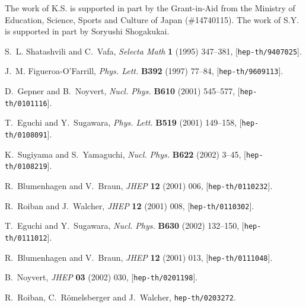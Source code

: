 \documentclass[a4paper,12pt]{article}
\numberwithin{equation}{section}
\begin{document}
The work of K.S. is supported in part by the Grant-in-Aid from the Ministry 
of Education, Science, Sports and Culture of Japan
(\#14740115).
The work of S.Y. is supported in part by Soryushi Shogakukai.
\providecommand{\href}[2]{#2}\begingroup\raggedright\begin{thebibliography}{10}

S.~L. Shatashvili and C.~Vafa, {\em Selecta Math} {\bf 1} (1995) 347--381,
  [\href{http://xxx.lanl.gov/abs/hep-th/9407025}{{\tt hep-th/9407025}}].

J.~M. Figueroa-O'Farrill, {\em Phys. Lett.} {\bf B392} (1997) 77--84,
  [\href{http://xxx.lanl.gov/abs/hep-th/9609113}{{\tt hep-th/9609113}}].

D.~Gepner and B.~Noyvert, {\em Nucl. Phys.} {\bf B610} (2001) 545--577,
  [\href{http://xxx.lanl.gov/abs/hep-th/0101116}{{\tt hep-th/0101116}}].

T.~Eguchi and Y.~Sugawara, {\em Phys. Lett.} {\bf B519} (2001) 149--158,
  [\href{http://xxx.lanl.gov/abs/hep-th/0108091}{{\tt hep-th/0108091}}].

K.~Sugiyama and S.~Yamaguchi, {\em Nucl. Phys.} {\bf B622} (2002) 3--45,
  [\href{http://xxx.lanl.gov/abs/hep-th/0108219}{{\tt hep-th/0108219}}].

R.~Blumenhagen and V.~Braun, {\em JHEP} {\bf 12} (2001) 006,
  [\href{http://xxx.lanl.gov/abs/hep-th/0110232}{{\tt hep-th/0110232}}].

R.~Roiban and J.~Walcher, {\em JHEP} {\bf 12} (2001) 008,
  [\href{http://xxx.lanl.gov/abs/hep-th/0110302}{{\tt hep-th/0110302}}].

T.~Eguchi and Y.~Sugawara, {\em Nucl. Phys.} {\bf B630} (2002) 132--150,
  [\href{http://xxx.lanl.gov/abs/hep-th/0111012}{{\tt hep-th/0111012}}].

R.~Blumenhagen and V.~Braun, {\em JHEP} {\bf 12} (2001) 013,
  [\href{http://xxx.lanl.gov/abs/hep-th/0111048}{{\tt hep-th/0111048}}].

B.~Noyvert, {\em JHEP} {\bf 03} (2002) 030,
  [\href{http://xxx.lanl.gov/abs/hep-th/0201198}{{\tt hep-th/0201198}}].

R.~Roiban, C.~R{\"o}melsberger and J.~Walcher,
  \href{http://xxx.lanl.gov/abs/hep-th/0203272}{{\tt hep-th/0203272}}.


\end{thebibliography}
\end{document}
